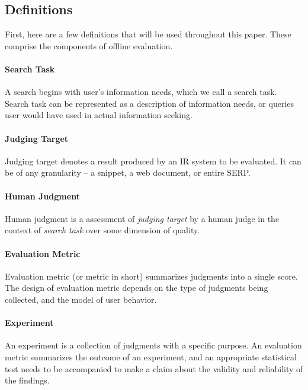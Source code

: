 \documentclass[openany]{now} %
\begin{document}
\subsection{Definitions}

First, here are a few definitions that will be used throughout this paper. These comprise the components of offline evaluation.

\paragraph{Search Task} A search begins with user's information needs, which we call a search task. Search task can be represented as a description of information needs, or queries user would have used in actual information seeking.

\paragraph{Judging Target} Judging target denotes a result produced by an IR system to be evaluated. It can be of any granularity -- a snippet, a web document, or entire SERP. 

\paragraph{Human Judgment} Human judgment is a assessment of \textit{judging target} by a human judge in the context of \textit{search task} over some dimension of quality. 

\paragraph{Evaluation Metric} Evaluation metric (or metric in short) summarizes judgments into a single score. The design of evaluation metric depends on the type of judgments being collected, and the model of user behavior.

\paragraph{Experiment} An experiment is a collection of judgments with a specific purpose. An evaluation metric summarizes the outcome of an experiment, and an appropriate statistical test needs to be accompanied to make a claim about the validity and reliability of the findings.

\end{document}
